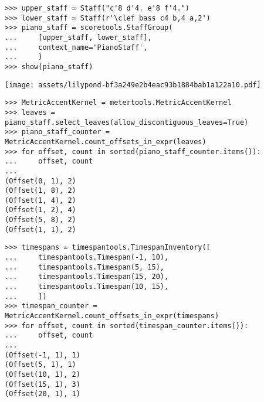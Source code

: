 \begin{singlespacing}
\vspace{-0.5\baselineskip}
\begin{lstlisting}
>>> upper_staff = Staff("c'8 d'4. e'8 f'4.")
>>> lower_staff = Staff(r'\clef bass c4 b,4 a,2')
>>> piano_staff = scoretools.StaffGroup(
...     [upper_staff, lower_staff],
...     context_name='PianoStaff',
...     )
>>> show(piano_staff)
\end{lstlisting}
\texttt{[image: assets/lilypond-bf3a249e2b4eac93b1884bab1a122a10.pdf]}
\end{singlespacing}

\begin{comment}
<abjad>
MetricAccentKernel = metertools.MetricAccentKernel
leaves = piano_staff.select_leaves(allow_discontiguous_leaves=True)
piano_staff_counter = MetricAccentKernel.count_offsets_in_expr(leaves)
for offset, count in sorted(piano_staff_counter.items()):
    offset, count

</abjad>
\end{comment}

\begin{singlespacing}
\vspace{-0.5\baselineskip}
\begin{lstlisting}
>>> MetricAccentKernel = metertools.MetricAccentKernel
>>> leaves = piano_staff.select_leaves(allow_discontiguous_leaves=True)
>>> piano_staff_counter = MetricAccentKernel.count_offsets_in_expr(leaves)
>>> for offset, count in sorted(piano_staff_counter.items()):
...     offset, count
...
(Offset(0, 1), 2)
(Offset(1, 8), 2)
(Offset(1, 4), 2)
(Offset(1, 2), 4)
(Offset(5, 8), 2)
(Offset(1, 1), 2)
\end{lstlisting}
\end{singlespacing}

\begin{comment}
<abjad>
timespans = timespantools.TimespanInventory([
    timespantools.Timespan(-1, 10),
    timespantools.Timespan(5, 15),
    timespantools.Timespan(15, 20),
    timespantools.Timespan(10, 15),
    ])
timespan_counter = MetricAccentKernel.count_offsets_in_expr(timespans)
for offset, count in sorted(timespan_counter.items()):
    offset, count

</abjad>
\end{comment}

\begin{singlespacing}
\vspace{-0.5\baselineskip}
\begin{lstlisting}
>>> timespans = timespantools.TimespanInventory([
...     timespantools.Timespan(-1, 10),
...     timespantools.Timespan(5, 15),
...     timespantools.Timespan(15, 20),
...     timespantools.Timespan(10, 15),
...     ])
>>> timespan_counter = MetricAccentKernel.count_offsets_in_expr(timespans)
>>> for offset, count in sorted(timespan_counter.items()):
...     offset, count
...
(Offset(-1, 1), 1)
(Offset(5, 1), 1)
(Offset(10, 1), 2)
(Offset(15, 1), 3)
(Offset(20, 1), 1)
\end{lstlisting}
\end{singlespacing}

